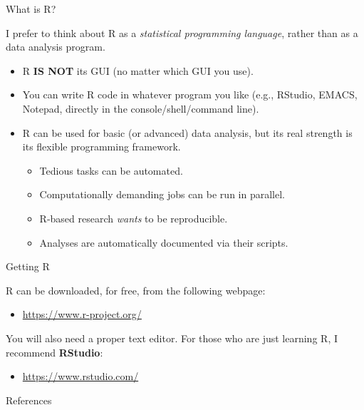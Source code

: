 \documentclass{beamer}
\newcommand{\va}[0]{\vspace{12pt}}
\newcommand{\vb}[0]{\vspace{6pt}}
\newcommand{\vc}[0]{\vspace{3pt}}
\newcommand{\lang}[1]{\textsf{#1}}
\newcommand{\pkg}[1]{\textbf{#1}}
\begin{document}
\begin{frame}{What is \lang{R}?}
  
  I prefer to think about \lang{R} as a \emph{statistical programming
    language}, rather than as a data analysis program.
  \vb
  \begin{itemize}
  \item \lang{R} \textbf{IS NOT} its GUI (no matter which GUI you use).
    \vb
  \item You can write \lang{R} code in whatever program you like
    (e.g., RStudio, EMACS, Notepad, directly in the
    console/shell/command line).
    \vb
  \item R can be used for basic (or advanced) data analysis, but its
    real strength is its flexible programming framework.
    \vc
    \begin{itemize}
      \item Tedious tasks can be automated.
        \vc
      \item Computationally demanding jobs can be run in parallel.
        \vc
      \item \lang{R}-based research \emph{wants} to be reproducible.
        \vc
      \item Analyses are automatically documented via their scripts.
    \end{itemize}
  \end{itemize}
  
\end{frame}


\begin{frame}{Getting \lang{R}}
  
  \lang{R} can be downloaded, for free, from the following webpage:
  \va
  \begin{itemize}
  \item \url{https://www.r-project.org/}
  \end{itemize}
  \va 
  You will also need a proper text editor. For those who are just
  learning \lang{R}, I recommend \pkg{RStudio}: 
  \va
  \begin{itemize}
  \item \url{https://www.rstudio.com/}
  \end{itemize}
  
\end{frame}

      
\begin{frame}[allowframebreaks]{References}
  
  
\end{frame}
\end{document}
